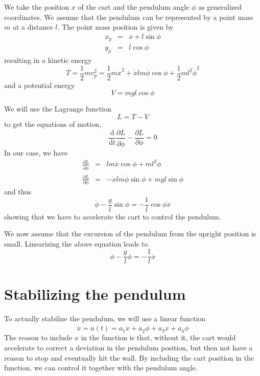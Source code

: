 \documentclass[a4paper]{article}
\begin{document}
We take the position $x$ of the cart and the pendulum angle $\phi$ as generalized coordinates. We assume that the pendulum can be represented by a point mass $m$ at a distance $l$. The point mass position is given by
\begin{eqnarray}
x_p &=& x + l \sin\phi\\
y_p &=& l \cos\phi
\end{eqnarray}
resulting in a kinetic energy
\begin{equation}
T = \frac{1}{2} m v_p^2 = \frac{1}{2} m \dot{x}^2 + \dot{x}lm\dot{\phi}\cos\phi + \frac{1}{2}ml^2\dot{\phi}^2
\end{equation}
and a potential energy
\begin{equation}
V = mgl\cos\phi
\end{equation}

We will use the Lagrange function
\begin{equation}
L = T - V
\end{equation}
to get the equations of motion,
\begin{equation}
\frac{\mathrm{d}}{\mathrm{d}t}\frac{\partial L}{\partial \dot{\phi}} - \frac{\partial L}{\partial \phi} = 0
\end{equation}
In our case, we have
\begin{eqnarray}
\frac{\partial L}{\partial \dot{\phi}} &=& l m \dot{x} \cos \phi + m l^2 \dot{\phi}\\
\frac{\partial L}{\partial \phi} &=& -\dot{x} l m \dot{\phi}\sin \phi + m g l \sin \phi
\end{eqnarray}
and thus
\begin{equation}
\ddot{\phi} - \frac{g}{l}\sin \phi = - \frac{1}{l} \cos \phi \ddot{x}
\end{equation}
showing that we have to accelerate the cart to control the pendulum.

We now assume that the excursion of the pendulum from the upright position is small. Linearizing the above equation leads to
\begin{equation}
\ddot{\phi} - \frac{g}{l} \phi = - \frac{1}{l} \ddot{x}
\end{equation}

\section{Stabilizing the pendulum}
To actually stabilize the pendulum, we will use a linear function
\begin{equation}
\ddot{x} = a(t) = a_1 \dot{x} + a_2 \dot{\phi} + a_3 x + a_4 \phi
\end{equation}
The reason to include $x$ in the function is that, without it, the cart would accelerate to correct a deviation in the pendulum position, but then not have a reason to stop and eventually hit the wall. By including the cart position in the function, we can control it together with the pendulum angle.
\end{document}
